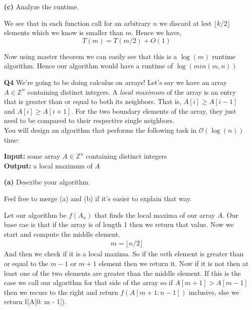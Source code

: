 \documentclass[12pt]{article}
\newcommand{\question}[3][Q]{
\begin{description}
\item \textbf{#1{#2}} #3
\end{description}
}
\newcommand{\note}[1]{{\footnotesize
    \begin{description}
    [leftmargin=3.4em,style=nextline]
        \item[Note:] {#1}
    \end{description}}   
}
\newcommand{\Z}{\mathbb{Z}}
\begin{document}
\question[]{(c)}{
    Analyze the runtime.
}
\begin{answer}
    We see that in each function call for an arbitrary $n$ we discard at lest $\lfloor k /2 \rfloor$ elements which we know is smaller than  $m$. Hence we have,
    $$ T(m) = T(m /2) + O(1)  $$ 

    Now using master theorem we can easily see that this is a $\log(m)$ runtime algorithm. Hence our algorithm would have a runtime of $\log(min(m,n))$
\end{answer}

\newpage
\question{4}{
    We're going to be doing calculus on arrays! Let's say we have an array $A \in \Z^{n}$ containing distinct integers. A \textit{local maximum} of the array is an entry that is greater than or equal to both its neighbors. That is, $A[i] \ge A[i-1]$ and $A[i] \ge A[i+1]$. For the two boundary elements of the array, they just need to be compared to their respective single neighbors.\\

    You will design an algorithm that performs the following task in $\mathcal{O}(\log(n))$ time:

    \textbf{Input:} some array $A \in \Z^{n}$ containing distinct integers\\
    \textbf{Output:} a local maximum of $A$
}
\question[]{(a)}{
    Describe your algorithm.
    \note{Feel free to merge (a) and (b) if it's easier to explain that way.}
}
\begin{answer}
    Let our algorithm be $f(A_n)$ that finds the local maxima of  our array  $A$. Our base cae is that if the array is of length 1 then we return that value. Now we start and compute  the middle element.
    \begin{align*}
        m = \lfloor n /2 \rfloor
    \end{align*}
    And then we check if it is a local maxima. So if the $m$th element is greater than or equal to the  $m - 1$ or $m + 1$ element then we return it. Now if it is not then at least one of the two elements are greater than the middle element. If this is the case we call our algorithm for that side of the array so if $A[m + 1] > A[m - 1]$ then we recurs to the right and return  $f(A[m + 1: n - 1])$ inclusive, else we return f(A[0: m - 1]).
\end{answer}
\end{document}
